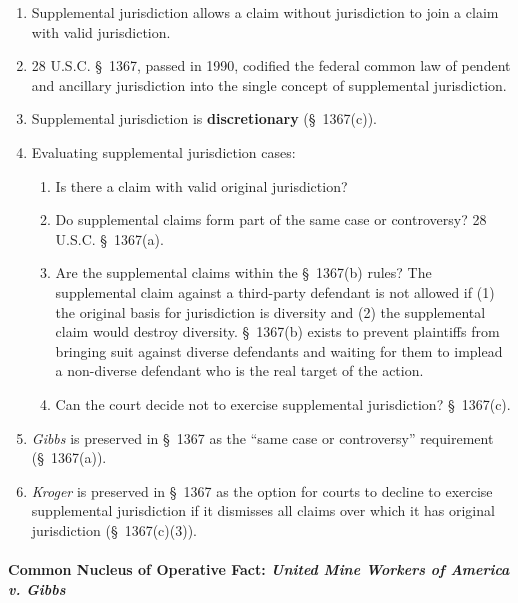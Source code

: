 \begin{enumerate}
    \item Supplemental jurisdiction allows a claim without jurisdiction to join a claim with valid jurisdiction.
    \item 28 U.S.C. \S\ 1367, passed in 1990, codified the federal common law of pendent and ancillary jurisdiction into the single concept of supplemental jurisdiction.
    \item Supplemental jurisdiction is \textbf{discretionary} (\S\ 1367(c)). 
    \item Evaluating supplemental jurisdiction cases:
    \begin{enumerate}
        \item Is there a claim with valid original jurisdiction?
        \item Do supplemental claims form part of the same case or controversy? 28 U.S.C. \S\ 1367(a).
        \item Are the supplemental claims within the \S\ 1367(b) rules? The supplemental claim against a third-party defendant is not allowed if (1) the original basis for jurisdiction is diversity and (2) the supplemental claim would destroy diversity. \S\ 1367(b) exists to prevent plaintiffs from bringing suit against diverse defendants and waiting for them to implead a non-diverse defendant who is the real target of the action.
        \item Can the court decide not to exercise supplemental jurisdiction? \S\ 1367(c).
    \end{enumerate}
    \item \emph{Gibbs} is preserved in \S\ 1367 as the ``same case or controversy'' requirement (\S\ 1367(a)).
    \item \emph{Kroger} is preserved in \S\ 1367 as the option for courts to decline to exercise supplemental jurisdiction if it dismisses all claims over which it has original jurisdiction (\S\ 1367(c)(3)). %
\end{enumerate}

\paragraph{Common Nucleus of Operative Fact: \emph{United Mine Workers of America v. Gibbs}}


